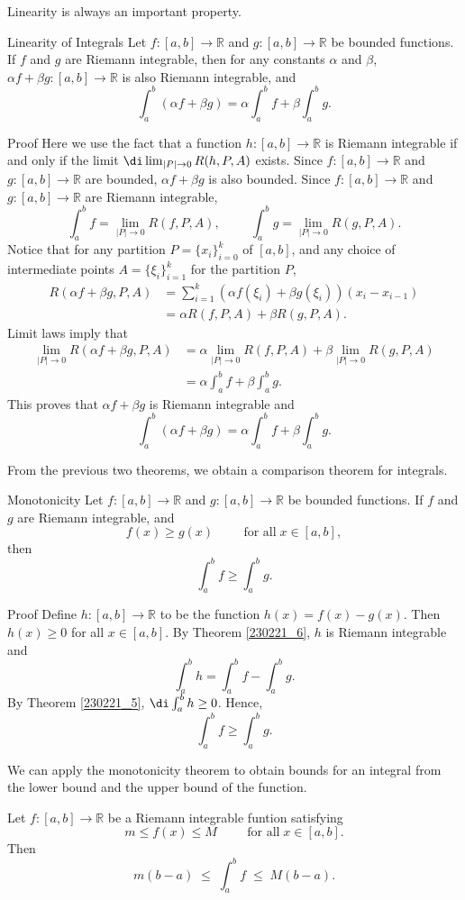 Linearity is always an important property. 
\begin{theorem}[label=230221_6]{Linearity of Integrals}
Let $f:[a,b]\to\mathbb{R}$ and $g:[a,b]\to\mathbb{R}$ be bounded functions. If $f$ and $g$ are Riemann integrable, then for any constants $\alpha$ and $\beta$, $\alpha f+\beta g:[a,b]\to\mathbb{R}$ is also Riemann integrable, and
\[\int_a^b(\alpha f+\beta g)=\alpha\int_a^b f+\beta \int_a^b g.\]
\end{theorem}
\begin{myproof}{Proof}
Here we   use   the fact that a function $h:[a,b]\to\mathbb{R}$ is Riemann integrable if and only if the limit
$\di \lim_{|P|\to 0}R(h,P,A)$ exists.  Since  $f:[a,b]\to\mathbb{R}$ and $g:[a,b]\to\mathbb{R}$ are bounded, $\alpha f+\beta g$ is also bounded. Since  $f:[a,b]\to\mathbb{R}$ and $g:[a,b]\to\mathbb{R}$ are Riemann integrable, 
\[\int_a^b f=\lim_{|P|\to 0}R(f,P,A),\hspace{1cm}\int_a^bg=\lim_{|P|\to 0}R(g,P,A).\]
Notice that for any partition $P=\{x_i\}_{i=0}^k$ of $[a,b]$, and any choice of intermediate points $A=\{\xi_i\}_{i=1}^k$ for the partition $P$,
\begin{align*}R(\alpha f+\beta g, P, A)&=\sum_{i=1}^k\left(\alpha f(\xi_i)+\beta g(\xi_i)\right)(x_i-x_{i-1})\\
&=\alpha R(f,P,A)+\beta R(g,P,A).\end{align*}
Limit laws imply that
\begin{align*}\lim_{|P|\to 0}R(\alpha f+\beta g, P, A)&=\alpha\lim_{|P|\to 0}R(f,P,A)+\beta\lim_{|P|\to 0}R(g,P,A)\\&=\alpha \int_a^b f+\beta\int_a^b g.\end{align*}
This proves that $\alpha f+\beta g $ is  Riemann integrable and
\[\int_a^b(\alpha f+\beta g)=\alpha\int_a^b f+\beta \int_a^b g.\]
\end{myproof}

From the previous two theorems, we   obtain a comparison theorem for integrals.
\begin{theorem}{Monotonicity}
Let $f:[a,b]\to\mathbb{R}$ and $g:[a,b]\to\mathbb{R}$ be bounded functions. If $f$ and $g$ are Riemann integrable, and 
\[f(x)\geq g(x)\hspace{1cm}\text{for all}\;x\in [a,b],\]
then
\[\int_a^b f\geq \int_a^b g.\]
\end{theorem}
\begin{myproof}{Proof}
Define $h:[a,b]\to\mathbb{R}$ to be the function
$h(x)=f(x)-g(x)$.
Then 
$h(x)\geq 0$ for all $x\in [a,b]$. 
By Theorem \ref{230221_6}, $h$ is Riemann integrable and 
\[\int_a^b h=\int_a^b f-\int_a^b g.\]
By Theorem \ref{230221_5}, $\di\int_a^b h\geq 0$. Hence,
\[\int_a^b f\geq \int_a^b g.\]
\end{myproof}
We can apply the monotonicity theorem to obtain  bounds for  an integral  from the lower bound and the upper bound of the function.
\begin{example}{}
Let $f:[a,b]\to\mathbb{R}$ be a Riemann integrable funtion satisfying 
\[m\leq f(x)\leq M\hspace{1cm}\text{for all}\;x\in [a,b].\]
Then
\[m(b-a)\;\leq\;\int_a^b f\;\leq\; M(b-a).\]
\end{example}

